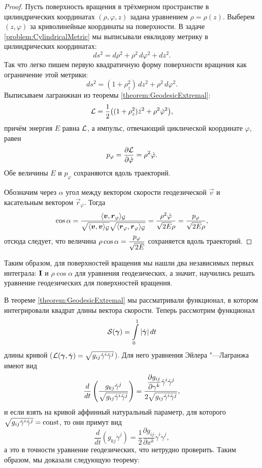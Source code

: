 \begin{proof} %
	Пусть поверхность вращения в трёхмерном пространстве в цилиндрических координатах $(\rho, \varphi, z)$ задана уравнением $\rho = \rho(z)$. Выберем $(z, \varphi)$ за криволинейные координаты на поверхности. В задаче \ref{problem:CylindricalMetric} мы выписывали евклидову метрику в цилиндрических координатах:
	\[
		ds^2 = d\rho^2 + \rho^2\,d\varphi^2 + dz^2.
	\]
	Так что легко пишем первую квадратичную форму поверхности вращения как ограничение этой метрики:
	\[
		ds^2 = (1 + \rho_z^2)\,dz^2 + \rho^2\,d\varphi^2.
	\]
	Выписываем лагранжиан из теоремы \ref{theorem:GeodesicExtremal}:
	\[
		\mathcal{L} = \frac{1}{2}\big((1 + \rho_z^2)\dot{z}^2 + \rho^2\dot{\varphi}^2\big),
	\]
	причём энергия $E$ равна $\mathcal{L}$, а импульс, отвечающий циклической координате $\varphi$, равен
	\[
		p_\varphi = \frac{\partial\mathcal{L}}{\partial\dot{\varphi}} = \rho^2\dot{\varphi}.
	\]
	Обе величины $E$ и $p_\varphi$ сохраняются вдоль траекторий.

	Обозначим через $\alpha$ угол между вектором скорости геодезической $\vec{v}$ и касательным вектором $\vec{r}_\varphi$. Тогда
	\[
		\cos\alpha = \frac{\langle\boldsymbol{v}, \boldsymbol{r}_\varphi\rangle_{\mathcal{G}}}{\sqrt{\langle\boldsymbol{v}, \boldsymbol{v}\rangle_{\mathcal{G}}}\sqrt{\langle\boldsymbol{r}_\varphi, \boldsymbol{r}_\varphi\rangle_{\mathcal{G}}}} = \frac{\rho^2\dot{\varphi}}{\sqrt{2E}\rho} = \frac{p_\varphi}{\sqrt{2E}\rho},
	\]
	отсюда следует, что величина $\displaystyle\rho\cos\alpha = \frac{p_\varphi}{\sqrt{2E}}$ сохраняется вдоль траекторий.
\end{proof}

Таким образом, для поверхностей вращения мы нашли два независимых первых интеграла: $\boldsymbol{\operatorname{I}}$ и $\rho\cos\alpha$ для уравнения геодезических, а значит, научились решать уравнение геодезических для поверхностей вращения.

В теореме \ref{theorem:GeodesicExtremal} мы рассматривали функционал, в котором интегрировали квадрат длины вектора скорости. Теперь рассмотрим функционал
\[
	\mathcal{S}(\boldsymbol{\gamma}) = \int\limits_0^1\left\lvert\dot{\boldsymbol{\gamma}}\right\rvert dt
\]
длины кривой ($\mathcal{L}(\boldsymbol{\gamma}, \dot{\boldsymbol{\gamma}}) = \sqrt{g_{ij}\dot{\gamma}^i\dot{\gamma}^j}$). Для него уравнения Эйлера "---Лагранжа имеют вид
\[
	\frac{d}{dt}\left(\frac{g_{kj}\dot{\gamma}^j}{\sqrt{g_{ij}\dot{\gamma}^i\dot{\gamma}^j}}\right) = \frac{\displaystyle\frac{\partial g_{ij}}{\partial\gamma^k}\dot{\gamma}^i\dot{\gamma}^j}{2\sqrt{g_{ij}\dot{\gamma}^i\dot{\gamma}^j}},
\]
и если взять на кривой аффинный натуральный параметр, для которого $\sqrt{g_{ij}\dot{\gamma}^i\dot{\gamma}^j} = \mathrm{const}$, то они примут вид
\[
	\frac{d}{dt}(g_{kj}\dot{\gamma}^j) = \frac{1}{2}\frac{\partial g_{ij}}{\partial x^k}\dot{\gamma}^i\dot{\gamma}^j,
\]
а это в точности уравнение геодезических, что нетрудно проверить. Таким образом, мы доказали следующую теорему:

